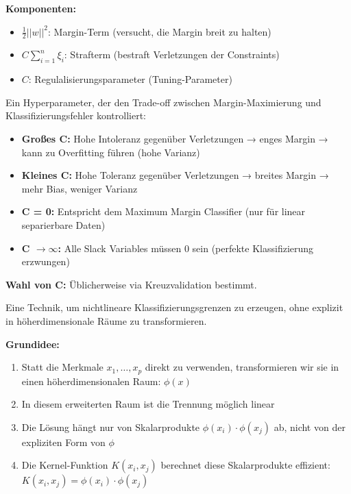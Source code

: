 \textbf{Komponenten:}
\begin{itemize}[leftmargin=1.5em]
    \item $\frac{1}{2}||w||^2$: Margin-Term (versucht, die Margin breit zu halten)
    \item $C \sum_{i=1}^{n} \xi_i$: Strafterm (bestraft Verletzungen der Constraints)
    \item $C$: Regulalisierungsparameter (Tuning-Parameter)
\end{itemize}

Ein Hyperparameter, der den Trade-off zwischen Margin-Maximierung und Klassifizierungsfehler kontrolliert:
\begin{itemize}[leftmargin=1.5em]
    \item \textbf{Großes C:} Hohe Intoleranz gegenüber Verletzungen → enges Margin → kann zu Overfitting führen (hohe Varianz)
    \item \textbf{Kleines C:} Hohe Toleranz gegenüber Verletzungen → breites Margin → mehr Bias, weniger Varianz
    \item \textbf{C = 0:} Entspricht dem Maximum Margin Classifier (nur für linear separierbare Daten)
    \item \textbf{C $\to \infty$:} Alle Slack Variables müssen 0 sein (perfekte Klassifizierung erzwungen)
\end{itemize}

\textbf{Wahl von C:} Üblicherweise via Kreuzvalidation bestimmt.

Eine Technik, um nichtlineare Klassifizierungsgrenzen zu erzeugen, ohne explizit in höherdimensionale Räume zu transformieren.

\textbf{Grundidee:}
\begin{enumerate}[leftmargin=1.5em]
    \item Statt die Merkmale $x_1, \ldots, x_p$ direkt zu verwenden, transformieren wir sie in einen höherdimensionalen Raum: $\phi(x)$
    \item In diesem erweiterten Raum ist die Trennung möglich linear
    \item Die Lösung hängt nur von Skalarprodukte $\phi(x_i) \cdot \phi(x_j)$ ab, nicht von der expliziten Form von $\phi$
    \item Die Kernel-Funktion $K(x_i, x_j)$ berechnet diese Skalarprodukte effizient: $K(x_i, x_j) = \phi(x_i) \cdot \phi(x_j)$
\end{enumerate}

